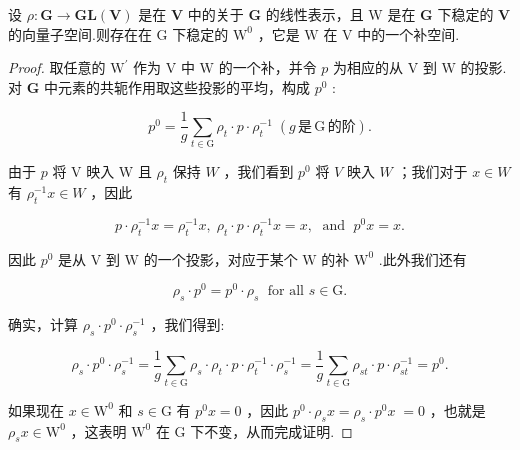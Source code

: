 \begin{theorem}[]
    设 \(\rho  : \mathbf{G} \rightarrow  \mathbf{{GL}}\left( \mathbf{V}\right)\) 是在 \(\mathbf{V}\) 中的关于 \(\mathbf{G}\) 的线性表示，且 W 是在 \(\mathbf{G}\) 下稳定的 \(\mathbf{V}\) 的向量子空间.则存在在 \(\mathrm{G}\) 下稳定的 \({\mathrm{W}}^{0}\) ，它是 \(\mathrm{W}\) 在 \(\mathrm{V}\) 中的一个补空间.
\end{theorem}
\begin{proof}
取任意的 \({\mathrm{W}}^{\prime }\) 作为 \(\mathrm{V}\) 中 \(\mathrm{W}\) 的一个补，并令 \(p\) 为相应的从 \(\mathrm{V}\) 到 \(\mathrm{W}\) 的投影.对 \(\mathbf{G}\) 中元素的共轭作用取这些投影的平均，构成 \({p}^{0}\) :

\[
{p}^{0} = \frac{1}{g}\mathop{\sum }\limits_{{t \in  \mathrm{G}}}{\rho }_{t} \cdot  p \cdot  {\rho }_{t}^{-1}\;\left( {g\,\text{是}\,\mathrm{G}\,\text{的阶}}\right) .
\]

由于 \(p\) 将 V 映入 W 且 \({\rho }_{t}\) 保持 \(W\) ，我们看到 \({p}^{0}\) 将 \(V\) 映入 \(W\) ；我们对于 \(x \in  W\) 有 \({\rho }_{t}^{-1}x \in  W\) ，因此

\[
p \cdot  {\rho }_{t}^{-1}x = {\rho }_{t}^{-1}x,\;{\rho }_{t} \cdot  p \cdot  {\rho }_{t}^{-1}x = x,\;\text{ and }\;{p}^{0}x = x.
\]

因此 \({p}^{0}\) 是从 \(\mathrm{V}\) 到 \(\mathrm{W}\) 的一个投影，对应于某个 \(\mathrm{W}\) 的补 \({\mathrm{W}}^{0}\) .此外我们还有

\[
{\rho }_{s} \cdot  {p}^{0} = {p}^{0} \cdot  {\rho }_{s}\;\text{ for all }s \in  \mathrm{G}.
\]

确实，计算 \({\rho }_{s} \cdot  {p}^{0} \cdot  {\rho }_{s}^{-1}\) ，我们得到:

\[
{\rho }_{s} \cdot  {p}^{0} \cdot  {\rho }_{s}^{-1} = \frac{1}{g}\mathop{\sum }\limits_{{t \in  \mathrm{G}}}{\rho }_{s} \cdot  {\rho }_{t} \cdot  p \cdot  {\rho }_{t}^{-1} \cdot  {\rho }_{s}^{-1} = \frac{1}{g}\mathop{\sum }\limits_{{t \in  \mathrm{G}}}{\rho }_{st} \cdot  p \cdot  {\rho }_{st}^{-1} = {p}^{0}.
\]

如果现在 \(x \in  {\mathrm{W}}^{0}\) 和 \(s \in  \mathrm{G}\) 有 \({p}^{0}x = 0\) ，因此 \({p}^{0} \cdot  {\rho }_{s}x = {\rho }_{s} \cdot  {p}^{0}x \; = 0\) ，也就是 \({\rho }_{s}x \in  {\mathrm{W}}^{0}\) ，这表明 \({\mathrm{W}}^{0}\) 在 \(\mathrm{G}\) 下不变，从而完成证明.
\end{proof}

